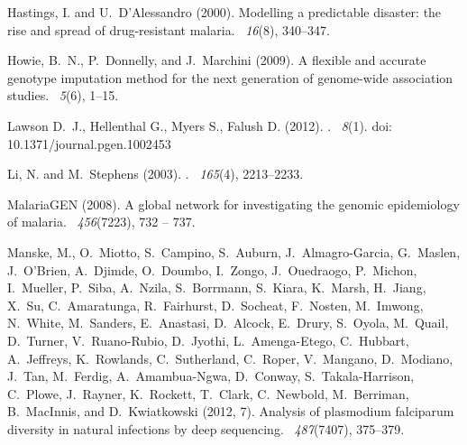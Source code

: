 \documentclass{bioinfo}
\begin{document}
\begin{thebibliography}{}
Hastings, I. and U.~D'Alessandro (2000).
\newblock Modelling a predictable disaster: the rise and spread of
  drug-resistant malaria.
~{\em 16\/}(8), 340--347.

Howie, B.~N., P.~Donnelly, and J.~Marchini (2009).
\newblock A flexible and accurate genotype imputation method for the next
  generation of genome-wide association studies.
~{\em 5\/}(6), 1--15.

Lawson D.~J., Hellenthal G., Myers S., Falush D. (2012).
. 
~{\em 8\/}(1). doi: 10.1371/journal.pgen.1002453

Li, N. and M.~Stephens (2003).
.
~{\em 165\/}(4), 2213--2233.

MalariaGEN (2008).
\newblock A global network for investigating the genomic epidemiology of
  malaria.
~{\em 456\/}(7223), 732 -- 737.

Manske, M., O.~Miotto, S.~Campino, S.~Auburn, J.~Almagro-Garcia, G.~Maslen,
  J.~O'Brien, A.~Djimde, O.~Doumbo, I.~Zongo, J.~Ouedraogo, P.~Michon,
  I.~Mueller, P.~Siba, A.~Nzila, S.~Borrmann, S.~Kiara, K.~Marsh, H.~Jiang,
  X.~Su, C.~Amaratunga, R.~Fairhurst, D.~Socheat, F.~Nosten, M.~Imwong,
  N.~White, M.~Sanders, E.~Anastasi, D.~Alcock, E.~Drury, S.~Oyola, M.~Quail,
  D.~Turner, V.~Ruano-Rubio, D.~Jyothi, L.~Amenga-Etego, C.~Hubbart,
  A.~Jeffreys, K.~Rowlands, C.~Sutherland, C.~Roper, V.~Mangano, D.~Modiano,
  J.~Tan, M.~Ferdig, A.~Amambua-Ngwa, D.~Conway, S.~Takala-Harrison, C.~Plowe,
  J.~Rayner, K.~Rockett, T.~Clark, C.~Newbold, M.~Berriman, B.~MacInnis, and
  D.~Kwiatkowski (2012, 7).
\newblock Analysis of plasmodium falciparum diversity in natural infections by
  deep sequencing.
~{\em 487\/}(7407), 375--379.


\end{thebibliography}
\end{document}
